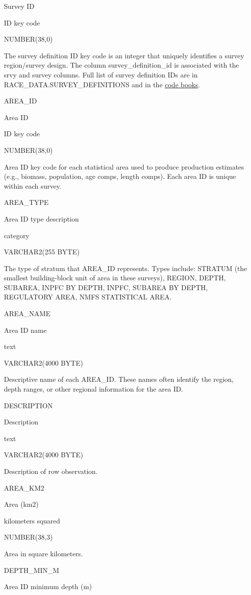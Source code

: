 \documentclass[
  letterpaper,
  oneside,
  open=any]{scrbook}
\begin{document}
Survey ID

ID key code

NUMBER(38,0)

The survey definition ID key code is an integer that uniquely identifies
a survey region/survey design. The column survey\_definition\_id is
associated with the srvy and survey columns. Full list of survey
definition IDs are in RACE\_DATA.SURVEY\_DEFINITIONS and in the
\href{https://www.fisheries.noaa.gov/resource/document/groundfish-survey-species-code-manual-and-data-codes-manual}{code
books}.

AREA\_ID

Area ID

ID key code

NUMBER(38,0)

Area ID key code for each statistical area used to produce production
estimates (e.g., biomass, population, age comps, length comps). Each
area ID is unique within each survey.

AREA\_TYPE

Area ID type description

category

VARCHAR2(255 BYTE)

The type of stratum that AREA\_ID represents. Types include: STRATUM
(the smallest building-block unit of area in these surveys), REGION,
DEPTH, SUBAREA, INPFC BY DEPTH, INPFC, SUBAREA BY DEPTH, REGULATORY
AREA, NMFS STATISTICAL AREA.

AREA\_NAME

Area ID name

text

VARCHAR2(4000 BYTE)

Descriptive name of each AREA\_ID. These names often identify the
region, depth ranges, or other regional information for the area ID.

DESCRIPTION

Description

text

VARCHAR2(4000 BYTE)

Description of row observation.

AREA\_KM2

Area (km2)

kilometers squared

NUMBER(38,3)

Area in square kilometers.

DEPTH\_MIN\_M

Area ID minimum depth (m)
\end{document}
